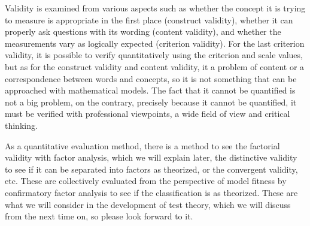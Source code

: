 \documentclass{ltjsbook}
\begin{document}
Validity is examined from various aspects such as whether the concept it is trying to measure is appropriate in the first place (construct validity), whether it can properly ask questions with its wording (content validity), and whether the measurements vary as logically expected (criterion validity). For the last criterion validity, it is possible to verify quantitatively using the criterion and scale values, but as for the construct validity and content validity, it a problem of content or a correspondence between words and concepts, so it is not something that can be approached with mathematical models. The fact that it cannot be quantified is not a big problem, on the contrary, precisely because it cannot be quantified, it must be verified with professional viewpoints, a wide field of view and critical thinking.

As a quantitative evaluation method, there is a method to see the factorial validity with factor analysis, which we will explain later, the distinctive validity to see if it can be separated into factors as theorized, or the convergent validity, etc. These are collectively evaluated from the perspective of model fitness by confirmatory factor analysis to see if the classification is as theorized. These are what we will consider in the development of test theory, which we will discuss from the next time on, so please look forward to it.
\end{document}
